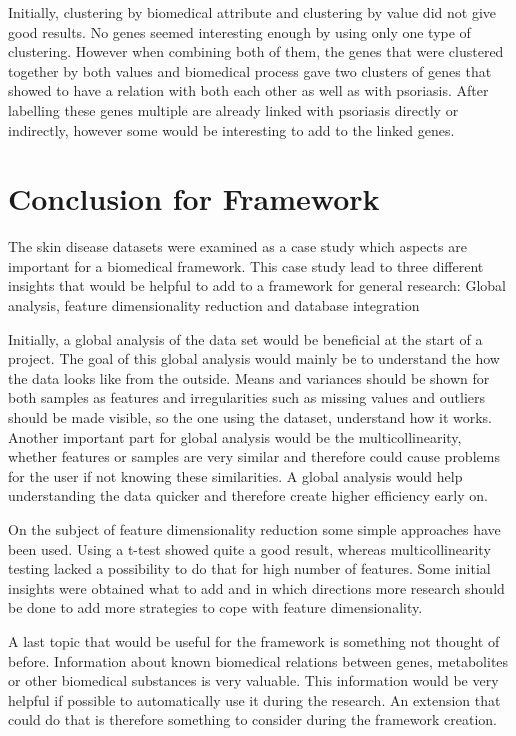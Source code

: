 \documentclass[10pt,a4paper]{article}
\begin{document}
	Initially, clustering by biomedical attribute and clustering by value did not give good results. No genes seemed interesting enough by using only one type of clustering. However when combining both of them, the genes that were clustered together by both values and biomedical process gave two clusters of genes that showed to have a relation with both each other as well as with psoriasis. After labelling these genes multiple are already linked with psoriasis directly or indirectly, however some would be interesting to add to the linked genes.
	
	
	\section{Conclusion for Framework}
	\label{sec:DiscussionForFramework}
	
	The skin disease datasets were examined as a case study which aspects are important for a biomedical framework. This case study lead to three different insights that would be helpful to add to a framework for general research: Global analysis, feature dimensionality reduction and database integration
	
	Initially, a global analysis of the data set would be beneficial at the start of a project. The goal of this global analysis would mainly be to understand the how the data looks like from the outside. Means and variances should be shown for both samples as features and irregularities such as missing values and outliers should be made visible, so the one using the dataset, understand how it works. Another important part for global analysis would be the multicollinearity, whether features or samples are very similar and therefore could cause problems for the user if not knowing these similarities. A global analysis would help understanding the data quicker and therefore create higher efficiency early on.
	
	On the subject of feature dimensionality reduction some simple approaches have been used. Using a t-test showed quite a good result, whereas multicollinearity testing lacked a possibility to do that for high number of features. Some initial insights were obtained what to add and in which directions more research should be done to add more strategies to cope with feature dimensionality.
	
	A last topic that would be useful for the framework is something not thought of before. Information about known biomedical relations between genes, metabolites or other biomedical substances is very valuable. This information would be very helpful if possible to automatically use it during the research. An extension that could do that is therefore something to consider during the framework creation. 
		
\end{document}
